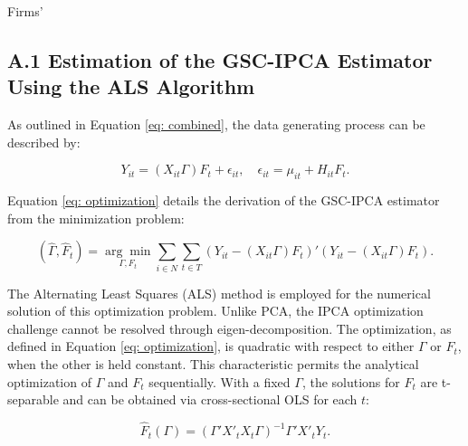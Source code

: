 \documentclass[12pt]{article}
\begin{document}
Firms' 

\begingroup
{}


\endgroup

\setcounter{figure}{0}
\setcounter{table}{0}
\renewcommand\thetable{\Alph{section}.\arabic{table}}
\renewcommand\thefigure{\Alph{section}.\arabic{figure}}

\subsection*{A.1 Estimation of the GSC-IPCA Estimator Using the ALS Algorithm}

As outlined in Equation \ref{eq: combined}, the data generating process can be described by:

\begin{equation*}
Y_{it} = (X_{it}\Gamma) F_{t} + \epsilon_{it}, \quad \epsilon_{it} = \mu_{it} + H_{it} F_t.
\end{equation*}

Equation \ref{eq: optimization} details the derivation of the GSC-IPCA estimator from the minimization problem:

\begin{equation*}
(\hat{\Gamma}, \hat{F}_t) = \underset{\Gamma, F_t}{\arg\min} \sum_{i \in N} \sum_{t \in T} \left( Y_{it} - (X_{it}\Gamma) F_{t} \right)' \left( Y_{it} - (X_{it}\Gamma) F_{t} \right).
\end{equation*}

The Alternating Least Squares (ALS) method is employed for the numerical solution of this optimization problem. Unlike PCA, the IPCA optimization challenge cannot be resolved through eigen-decomposition. The optimization, as defined in Equation \ref{eq: optimization}, is quadratic with respect to either $\Gamma$ or $F_t$, when the other is held constant. This characteristic permits the analytical optimization of $\Gamma$ and $F_t$ sequentially. With a fixed $\Gamma$, the solutions for $F_t$ are t-separable and can be obtained via cross-sectional OLS for each $t$:

\begin{equation*}
\hat{F}_t(\Gamma) = (\Gamma' X'_t X_t \Gamma)^{-1} \Gamma' X'_t Y_t.
\end{equation*}
\end{document}
